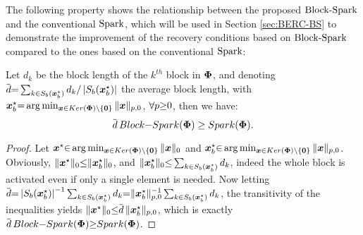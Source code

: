 The following property shows the relationship between the proposed $\mathrm{Block\text{{-}}Spark}$ and the conventional $\mathrm{Spark}$, which will be used in Section \ref{sec:BERC-BS} to demonstrate the improvement of the recovery conditions based on $\mathrm{Block\text{{-}}Spark}$ compared to the ones based on the conventional $\mathrm{Spark}$:
\begin{property}
\label{prp:BS-S}
Let $d_k$ be the block length of the $k^{th}$ block in $\boldsymbol{\Phi}$, and denoting $\overbar{d} \seq \sum_{k \ssin S_b(\boldsymbol{x}^\star_b)}d_k / \myabs{S_b(\boldsymbol x^\star_b)}$ the average block length, with $\boldsymbol{x}^\star_b {=} \arg \min_{\boldsymbol{x} {\in} Ker(\boldsymbol{\Phi}) \backslash\{\boldsymbol{0}\}} \Vert \boldsymbol{x} \Vert_{p,0}$, $\forall p {\geq} 0$, then we have:
\begin{equation*}
\overbar{d} \, \myBSpkMath \geq \mySpkMath.
\end{equation*}
\end{property}
\begin{proof}
Let $\boldsymbol{x}^\star {\in} \arg \min_{\boldsymbol{x} {\in} Ker(\boldsymbol{\Phi}) \backslash\{\boldsymbol{0}\}} \Vert \boldsymbol{x} \Vert_{0}$ and $\boldsymbol{x}^\star_b {\in} \arg \min_{\boldsymbol{x}{\in} Ker(\boldsymbol{\Phi}) \backslash\{\boldsymbol{0}\}} \Vert \boldsymbol{x} \Vert_{p,0}$. 
Obviously, $\Vert \boldsymbol{x}^\star \Vert_0 {\leq} \Vert\boldsymbol{x}^\star_b \Vert_{0}$, and $\Vert \boldsymbol{x}^\star_b \Vert_{0}{\leq} \sum_{k\in S_b(\boldsymbol{x}^\star_b)}d_k$, indeed the whole block is activated even if only a single element is needed. 
Now letting $\overbar{d} \seq \myabs{S_b(\boldsymbol{x}^\star_b)}^{-1}\sum_{k\ssin S_b(\boldsymbol{x}^\star_b)}d_k \seq \Vert \boldsymbol{x}^\star_b\Vert_{p,0}^{-1}\sum_{k\in S_b(\boldsymbol{x}^\star_b)}d_k$, the transitivity of the inequalities yields $\Vert \boldsymbol{x}^\star \Vert_0 \sleq \overbar{d} \, \Vert \boldsymbol{x}^\star_b \Vert_{p,0}$, which is exactly $\overbar{d} \, \myBSpkMath \sgeq \mySpkMath$.
\end{proof}